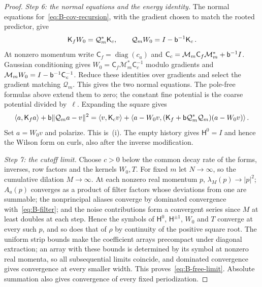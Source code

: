 \begin{proof}
\emph{Step 6: the normal equations and the energy identity.} The normal equations for~\eqref{eq:B-cov-recursion}, with the gradient chosen to match the rooted predictor, give
\begin{equation*}
\mathsf K_fW_0=\mathcal Q_m^*\mathsf K_c,\qquad
\mathcal Q_mW_0=I-\mathsf{b}^{-1}\mathsf K_c\,.
\end{equation*}
At nonzero momentum write $\mathsf C_f=\operatorname{diag}(c_a)$ and $\mathsf C_c=\mathcal M_m\mathsf C_f\mathcal M_m^*+\mathsf{b}^{-1}I$. Gaussian conditioning gives $W_0=\mathsf C_f\mathcal M_m^*\mathsf C_c^{-1}$ modulo gradients and $\mathcal M_mW_0=I-\mathsf{b}^{-1}\mathsf C_c^{-1}$. Reduce these identities over gradients and select the gradient matching $\mathcal Q_m$. This gives the two normal equations. The pole-free formulas above extend them to zero; the constant fine potential is the coarse potential divided by~$\ell$. Expanding the square gives
\begin{equation*}
\langle a,\mathsf K_fa\rangle+\mathsf{b}\|\mathcal Q_ma-v\|^2
=\langle v,\mathsf K_cv\rangle+\langle a-W_0v,(\mathsf K_f+\mathsf{b}\mathcal Q_m^*\mathcal Q_m)(a-W_0v)\rangle\,.
\end{equation*}
Set $a=W_0v$ and polarize. This is~(i). The empty history gives $\mathsf H^0=I$ and hence the Wilson form on curls, also after the inverse modification.

\emph{Step 7: the cutoff limit.} Choose $c>0$ below the common decay rate of the forms, inverses, row factors and the kernels $W_0,T$. For fixed $m$ let $N\to\infty$, so the cumulative dilation $M\to\infty$. At each nonzero real momentum $p$, $\lambda_M(p)\to|p|^2$; $A_a(p)$ converges as a product of filter factors whose deviations from one are summable; the nonprincipal aliases converge by dominated convergence with~\eqref{eq:B-filter}; and the noise contributions form a convergent series since $M$ at least doubles at each step. Hence the symbols of $\mathsf H^0$, $\mathsf H^{\pm1}$, $W_0$ and $T$ converge at every such $p$, and so does that of $\rho$ by continuity of the positive square root. The uniform strip bounds make the coefficient arrays precompact under diagonal extraction; an array with these bounds is determined by its symbol at nonzero real momenta, so all subsequential limits coincide, and dominated convergence gives convergence at every smaller width. This proves~\eqref{eq:B-free-limit}. Absolute summation also gives convergence of every fixed periodization.
\end{proof}

